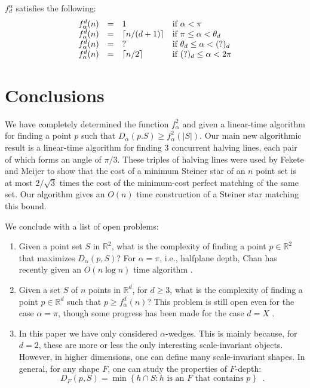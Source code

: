 \documentclass[lotsofwhite]{patmorin}
\newcommand{\crap}[1]{(?)_d}
\begin{document}
\begin{lem}
$f^\alpha_d$ satisfies the following:
\[\begin{array}{lcll}
  f^d_\alpha(n) & = & 1 & \mbox{if $\alpha < \pi$} \\
  f^d_\alpha(n) & = & \ceil{n/(d+1)} & \mbox{if $\pi \le \alpha < \theta_d$} \\
  f^d_\alpha(n) & = & ? & \mbox{if $\theta_d \le \alpha < \crap{d}$} \\
  f^d_\alpha(n) & = & \ceil{n/2} & \mbox{if $\crap{d}\le \alpha < 2\pi$} \\
\end{array}\]
\end{lem}





\section{Conclusions}

We have completely determined the function $f^2_\alpha$ and given a
linear-time algorithm for finding a point $p$ such that
$D_\alpha(p.S)\ge f^2_\alpha(|S|)$.  Our main new algorithmic result
is a linear-time algorithm for finding 3 concurrent halving lines,
each pair of which forms an angle of $\pi/3$.  These triples of
halving lines were used by Fekete and Meijer to show that the cost of
a minimum Steiner star of an $n$ point set is at most $2/\sqrt{3}$
times the cost of the minimum-cost perfect matching of the same set.
Our algorithm gives an $O(n)$ time construction of a Steiner star
matching this bound.



We conclude with a list of open problems:

\begin{enumerate}
\item Given a point set $S$ in $\mathbb{R}^2$, what is the complexity
of finding a point $p\in\mathbb{R}^2$ that maximizes $D_\alpha(p,S)$?
For $\alpha=\pi$, i.e., halfplane depth, Chan has recently given an
$O(n\log n)$ time algorithm \cite{c04}.

\item Given a set $S$ of $n$ points in $\mathbb{R}^d$, for $d\ge 3$,
what is the complexity of finding a point $p\in \mathbb{R}^d$ such
that $p\ge f_\alpha^d(n)$?  This problem is still open even for the
case $\alpha=\pi$, though some progress has been made for the case
$d=X$ \cite{X}.

\item In this paper we have only considered $\alpha$-wedges.  This is
mainly because, for $d=2$, these are more or less the only interesting
scale-invariant objects.  However, in higher dimensions, one can
define many scale-invariant shapes.  In general, for any shape $F$,
one can study the properties of $F$-depth:
\[
  D_F(p,S) = \min\left\{ 
     h\cap S : \mbox{$h$ is an $F$ that contains $p$}
  \right\} \enspace .
\] 
\end{enumerate}
\end{document}
